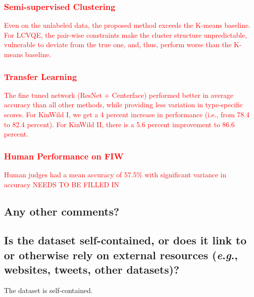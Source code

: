 \documentclass[a4paper,9pt]{extarticle}
\newcommand{\ie}{\textit{i}.\textit{e}., }
\newcommand{\eg}{\textit{e}.\textit{g}., }
\begin{document}
\begin{multicols}{2}
\subsubsection*{\textcolor{red}{Semi-supervised Clustering}}
\textcolor{red}{
Even on the unlabeled data, the proposed method exceeds the K-means baseline. For LCVQE, the pair-wise constraints make the cluster structure unpredictable, vulnerable to deviate from the true one, and, thus, perform worse than the K-means baseline.
}

\subsubsection*{\textcolor{red}{Transfer Learning}}
\textcolor{red}{
The fine tuned network (ResNet + Centerface) performed better in average accuracy than all other methods, while providing less variation in type-specific scores. For KinWild I, we get a 4 percent increase in performance (i.e., from 78.4 to 82.4 percent). For KinWild II, there is a 5.6 percent improvement to 86.6 percent.
}

\subsubsection*{\textcolor{red}{Human Performance on FIW}}
\textcolor{red}{
Human judges had a mean accuracy of 57.5\% with significant variance in accuracy 
NEEDS TO BE FILLED IN
}



\subsection*{Any other comments?}

\subsection*{Is the dataset self-contained, or does it link to or otherwise rely on external resources (\eg websites, tweets, other datasets)?}
\noindent The dataset is self-contained.


\end{multicols}
\end{document}
